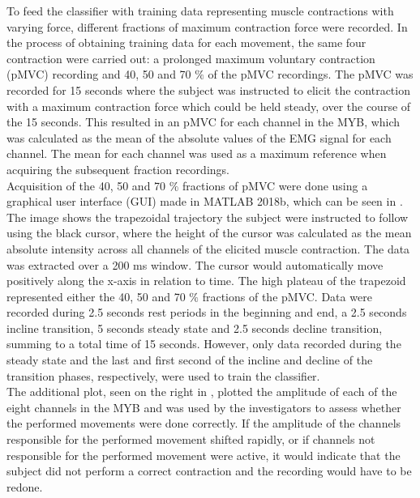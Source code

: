 To feed the classifier with training data representing muscle contractions with varying force, different fractions of maximum contraction force were recorded. In the process of obtaining training data for each movement, the same four contraction were carried out: a prolonged maximum voluntary contraction (pMVC) recording and 40, 50 and 70 $\percent$ of the pMVC recordings.
The pMVC was recorded for 15 seconds where the subject was instructed to elicit the contraction with a maximum contraction force which could be held steady, over the course of the 15 seconds. This resulted in an pMVC for each channel in the MYB, which was calculated as the mean of the absolute values of the EMG signal for each channel. The mean for each channel was used as a maximum reference when acquiring the subsequent fraction recordings. \\
Acquisition of the 40, 50 and 70 $\percent$ fractions of pMVC were done using a graphical user interface (GUI) made in MATLAB 2018b, which can be seen in . The image shows the trapezoidal trajectory the subject were instructed to follow using the black cursor, where the height of the cursor was calculated as the mean absolute intensity across all channels of the elicited muscle contraction. The data was extracted over a 200 ms window. The cursor would automatically move positively along the x-axis in relation to time. The high plateau of the trapezoid represented either the 40, 50 and 70 $\percent$ fractions of the pMVC. Data were recorded during 2.5 seconds rest periods in the beginning and end, a 2.5 seconds incline transition, 5 seconds steady state and 2.5 seconds decline transition, summing to a total time of 15 seconds. However, only data recorded during the steady state and the last and first second of the incline and decline of the transition phases, respectively, were used to train the classifier. \\
The additional plot, seen on the right in , plotted the amplitude of each of the eight channels in the MYB and was used by the investigators to assess whether the performed movements were done correctly. If the amplitude of the channels responsible for the performed movement shifted rapidly, or if channels not responsible for the performed movement were active, it would indicate that the subject did not perform a correct contraction and the recording would have to be redone.   
   
   

